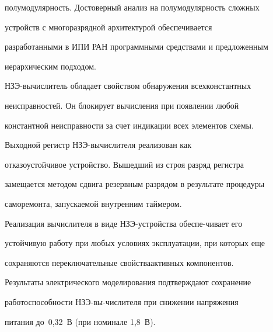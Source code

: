 полумодулярность. Достоверный анализ на полумодулярность сложных


устройств с многоразрядной архитектурой обеспечивается


разработанными в ИПИ РАН програм\-мны\-ми средствами и предложенным


иерархическим подходом.





   НЗЭ-вычислитель обладает свойством обнаружения всех\linebreak  константных


неисправностей. Он блокирует вычисления при появлении любой


константной неисправности за счет индикации всех элементов схемы.


Выходной регистр НЗЭ-вы\-чис\-ли\-те\-ля реализован как


отказоустойчивое устройство. Вышедший из строя разряд регистра


замещается методом сдвига резервным разрядом в результате процедуры


саморемонта, запускаемой внутренним таймером.





   Реализация вычислителя в виде НЗЭ-устройства обес\-пе-\linebreak чивает его


устойчивую работу при любых условиях эксплу\-а\-та\-ции, при которых еще


сохраняются переключательные свойства\linebreak активных компонентов.


Результаты электрического моделирования подтверждают сохранение


работоспособности НЗЭ-вы-\linebreak чис\-ли\-те\-ля при снижении напряжения


питания до~0,32~В (при номинале 1,8~В).





